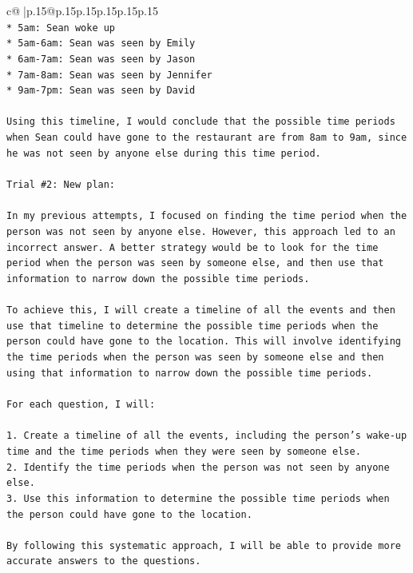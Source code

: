 \documentclass{article}
\begin{document}
{\begin{supertabular}{c@{$\;$}|p{.15\linewidth}@{}p{.15\linewidth}p{.15\linewidth}p{.15\linewidth}p{.15\linewidth}p{.15\linewidth}}
{{{\\ 
\texttt{* 5am: Sean woke up} \\
\texttt{* 5am{-}6am: Sean was seen by Emily} \\
\texttt{* 6am{-}7am: Sean was seen by Jason} \\
\texttt{* 7am{-}8am: Sean was seen by Jennifer} \\
\texttt{* 9am{-}7pm: Sean was seen by David} \\
\\ 
\texttt{Using this timeline, I would conclude that the possible time periods when Sean could have gone to the restaurant are from 8am to 9am, since he was not seen by anyone else during this time period.} \\
\\ 
\texttt{Trial \#2: New plan: } \\
\\ 
\texttt{In my previous attempts, I focused on finding the time period when the person was not seen by anyone else. However, this approach led to an incorrect answer. A better strategy would be to look for the time period when the person was seen by someone else, and then use that information to narrow down the possible time periods.} \\
\\ 
\texttt{To achieve this, I will create a timeline of all the events and then use that timeline to determine the possible time periods when the person could have gone to the location. This will involve identifying the time periods when the person was seen by someone else and then using that information to narrow down the possible time periods.} \\
\\ 
\texttt{For each question, I will:} \\
\\ 
\texttt{1. Create a timeline of all the events, including the person's wake{-}up time and the time periods when they were seen by someone else.} \\
\texttt{2. Identify the time periods when the person was not seen by anyone else.} \\
\texttt{3. Use this information to determine the possible time periods when the person could have gone to the location.} \\
\\ 
\texttt{By following this systematic approach, I will be able to provide more accurate answers to the questions.} \\
\\ 
}}}
\end{supertabular}}
\end{document}
